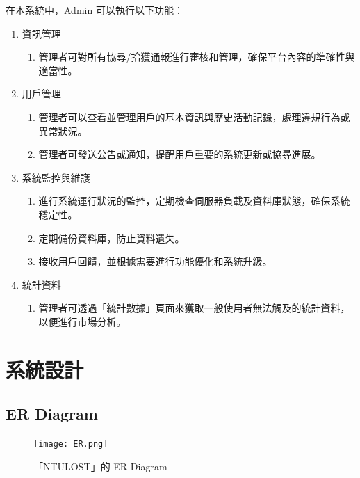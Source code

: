 \documentclass[12pt,a4paper]{article}
\begin{document}
在本系統中，Admin 可以執行以下功能：
\begin{enumerate}
\item 

資訊管理
\begin{enumerate}
    \item 管理者可對所有協尋/拾獲通報進行審核和管理，確保平台內容的準確性與適當性。
\end{enumerate}

\item 

用戶管理
\begin{enumerate}
    \item 管理者可以查看並管理用戶的基本資訊與歷史活動記錄，處理違規行為或異常狀況。
    \item 管理者可發送公告或通知，提醒用戶重要的系統更新或協尋進展。
\end{enumerate}

\item 

系統監控與維護
\begin{enumerate}
    \item 進行系統運行狀況的監控，定期檢查伺服器負載及資料庫狀態，確保系統穩定性。
    \item 定期備份資料庫，防止資料遺失。
    \item 接收用戶回饋，並根據需要進行功能優化和系統升級。
\end{enumerate}

\item 

統計資料
\begin{enumerate}
    \item 管理者可透過「統計數據」頁面來獲取一般使用者無法觸及的統計資料，以便進行市場分析。
\end{enumerate}


\end{enumerate}

\newpage

\section{系統設計}

\subsection{ER Diagram}

\vspace*{1cm}
\begin{figure}[hbt]
    \hspace*{-2.5cm}\texttt{[image: ER.png]}
    \caption{「NTULOST」的 ER Diagram}
    \label{fig:erDiagram}
\end{figure}
\end{document}
